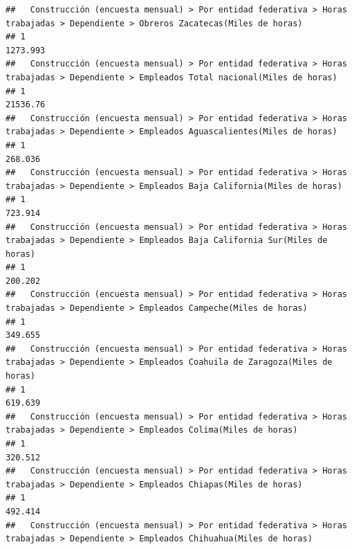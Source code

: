 \documentclass[
]{article}
\begin{document}
\begin{verbatim}
##   Construcción (encuesta mensual) > Por entidad federativa > Horas trabajadas > Dependiente > Obreros Zacatecas(Miles de horas) 
## 1                                                                                                                       1273.993
##   Construcción (encuesta mensual) > Por entidad federativa > Horas trabajadas > Dependiente > Empleados Total nacional(Miles de horas) 
## 1                                                                                                                              21536.76
##   Construcción (encuesta mensual) > Por entidad federativa > Horas trabajadas > Dependiente > Empleados Aguascalientes(Miles de horas) 
## 1                                                                                                                               268.036
##   Construcción (encuesta mensual) > Por entidad federativa > Horas trabajadas > Dependiente > Empleados Baja California(Miles de horas) 
## 1                                                                                                                                723.914
##   Construcción (encuesta mensual) > Por entidad federativa > Horas trabajadas > Dependiente > Empleados Baja California Sur(Miles de horas) 
## 1                                                                                                                                    200.202
##   Construcción (encuesta mensual) > Por entidad federativa > Horas trabajadas > Dependiente > Empleados Campeche(Miles de horas) 
## 1                                                                                                                         349.655
##   Construcción (encuesta mensual) > Por entidad federativa > Horas trabajadas > Dependiente > Empleados Coahuila de Zaragoza(Miles de horas) 
## 1                                                                                                                                     619.639
##   Construcción (encuesta mensual) > Por entidad federativa > Horas trabajadas > Dependiente > Empleados Colima(Miles de horas) 
## 1                                                                                                                       320.512
##   Construcción (encuesta mensual) > Por entidad federativa > Horas trabajadas > Dependiente > Empleados Chiapas(Miles de horas) 
## 1                                                                                                                        492.414
##   Construcción (encuesta mensual) > Por entidad federativa > Horas trabajadas > Dependiente > Empleados Chihuahua(Miles de horas) 

\end{verbatim}
\end{document}
